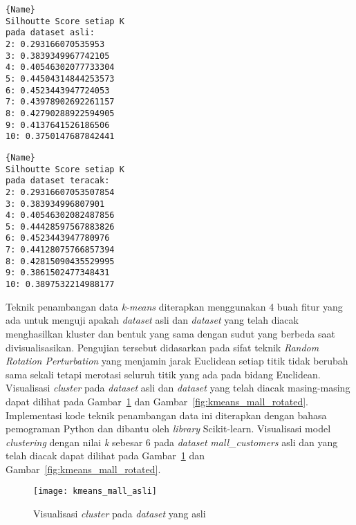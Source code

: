 \noindent\begin{minipage}{.46\textwidth}
\begin{lstlisting}[caption=\textit{Dataset mall\_customers} Asli,frame=tlrb, label=mall_customers_siluet_asli]{Name}
Silhoutte Score setiap K
pada dataset asli: 
2: 0.293166070535953
3: 0.3839349967742105
4: 0.40546302077733304
5: 0.44504314844253573
6: 0.4523443947724053
7: 0.43978902692261157
8: 0.42790288922594905
9: 0.4137641526186506
10: 0.3750147687842441
\end{lstlisting}
\end{minipage}\hfill
\begin{minipage}{.46\textwidth}
\begin{lstlisting}[caption=\textit{Dataset mall\_customers} Teracak,frame=tlrb, label=mall_customers_siluet_randomisasi]{Name}
Silhoutte Score setiap K
pada dataset teracak: 
2: 0.29316607053507854
3: 0.383934996807901
4: 0.40546302082487856
5: 0.44428597567883826
6: 0.4523443947780976
7: 0.44128075766857394
8: 0.42815090435529995
9: 0.3861502477348431
10: 0.3897532214988177
\end{lstlisting}
\end{minipage}

Teknik penambangan data \textit{k-means} diterapkan menggunakan 4 buah fitur yang ada untuk menguji apakah \textit{dataset} asli dan \textit{dataset} yang telah diacak menghasilkan kluster dan bentuk yang sama dengan sudut yang berbeda saat divisualisasikan. Pengujian tersebut didasarkan pada sifat teknik \textit{Random Rotation Perturbation} yang menjamin jarak Euclidean setiap titik tidak berubah sama sekali tetapi merotasi seluruh titik yang ada pada bidang Euclidean. Visualisasi \textit{cluster} pada \textit{dataset} asli dan \textit{dataset} yang telah diacak masing-masing dapat dilihat pada Gambar~\ref{fig:kmeans_mall_asli} dan Gambar~\ref{fig:kmeans_mall_rotated}. Implementasi kode teknik penambangan data ini diterapkan dengan bahasa pemograman Python dan dibantu oleh \textit{library} Scikit-learn. Visualisasi model \textit{clustering} dengan nilai \textit{k} sebesar 6 pada \textit{dataset} \textit{mall\_customers} asli dan yang telah diacak dapat dilihat pada Gambar~\ref{fig:kmeans_mall_asli} dan Gambar~\ref{fig:kmeans_mall_rotated}. 

\begin{figure}
	\centering
	\texttt{[image: kmeans\_mall\_asli]}
	\caption{Visualisasi \textit{cluster} pada \textit{dataset} yang asli}
	\label{fig:kmeans_mall_asli}
\end{figure}

